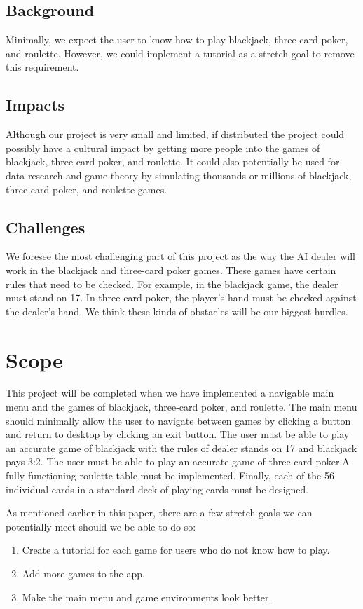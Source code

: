 \documentclass[10pt,conference,onecolumn,compsoc]{IEEEtran}
\begin{document}
\subsection{Background}
Minimally, we expect the user to know how to play blackjack, three-card poker, and roulette. However, we could implement a tutorial as a stretch goal to remove this requirement.

\subsection{Impacts}
Although our project is very small and limited, if distributed the project could possibly have a cultural impact by getting more people into the games of blackjack, three-card poker, and roulette. It could also potentially be used for data research and game theory by simulating thousands or millions of blackjack, three-card poker, and roulette games.

\subsection{Challenges}
We foresee the most challenging part of this project as the way the AI dealer will work in the blackjack and three-card poker games. These games have certain rules that need to be checked. For example, in the blackjack game, the dealer must stand on 17. In three-card poker, the player's hand must be checked against the dealer's hand. We think these kinds of obstacles will be our biggest hurdles.


\section{Scope}
This project will be completed when we have implemented a navigable main menu and the games of blackjack, three-card poker, and roulette. The main menu should minimally allow the user to navigate between games by clicking a button and return to desktop by clicking an exit button. The user must be able to play an accurate game of blackjack with the rules of dealer stands on 17 and blackjack pays 3:2. The user must be able to play an accurate game of three-card poker.A fully functioning roulette table must be implemented. Finally, each of the 56 individual cards in a standard deck of playing cards must be designed.


As mentioned earlier in this paper, there are a few stretch goals we can potentially meet should we be able to do so:\\

\begin{enumerate}
\item Create a tutorial for each game for users who do not know how to play.
\item Add more games to the app.
\item Make the main menu and game environments look better.
\end{enumerate}


\end{document}

